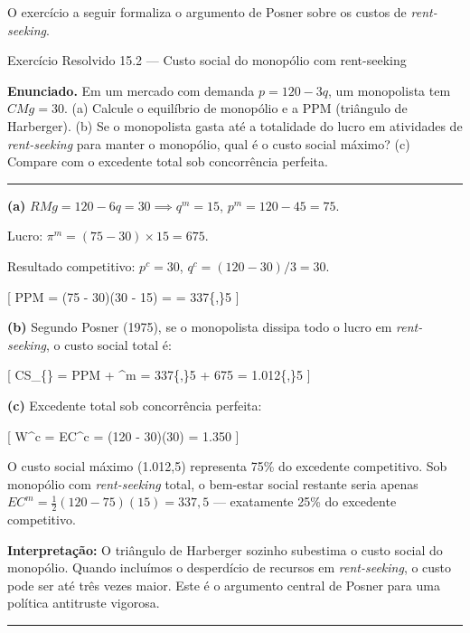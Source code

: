 \documentclass[11pt,twoside,openright]{book}
\begin{document}
O exercício a seguir formaliza o argumento de Posner sobre os custos de
\emph{rent-seeking}.

\begin{exresolvidobox}{Exercício Resolvido 15.2 — Custo social do monopólio com rent-seeking}

\textbf{Enunciado.} Em um mercado com demanda \(p = 120 - 3q\), um
monopolista tem \(CMg = 30\). (a) Calcule o equilíbrio de monopólio e a
PPM (triângulo de Harberger). (b) Se o monopolista gasta até a
totalidade do lucro em atividades de \emph{rent-seeking} para manter o
monopólio, qual é o custo social máximo? (c) Compare com o excedente
total sob concorrência perfeita.

\begin{center}\rule{0.5\linewidth}{0.5pt}\end{center}

\textbf{(a)} \(RMg = 120 - 6q = 30 \implies q^m = 15\),
\(p^m = 120 - 45 = 75\).

Lucro: \(\pi^m = (75 - 30) \times 15 = 675\).

Resultado competitivo: \(p^c = 30\), \(q^c = (120-30)/3 = 30\).

{[} PPM = (75 - 30)(30 - 15) =  
 = 337\{,\}5 {]}

\textbf{(b)} Segundo Posner (1975), se o monopolista dissipa todo o
lucro em \emph{rent-seeking}, o custo social total é:

{[} CS\_\{\} = PPM + \pi\^{}m = 337\{,\}5 + 675 =
1.012\{,\}5 {]}

\textbf{(c)} Excedente total sob concorrência perfeita:

{[} W\^{}c = EC\^{}c = (120 - 30)(30) = 1.350 {]}

O custo social máximo (1.012,5) representa 75\% do excedente
competitivo. Sob monopólio com \emph{rent-seeking} total, o bem-estar
social restante seria apenas
\(EC^m = \frac{1}{2}(120-75)(15) = 337{,}5\) --- exatamente 25\% do
excedente competitivo.

\textbf{Interpretação:} O triângulo de Harberger sozinho subestima o
custo social do monopólio. Quando incluímos o desperdício de recursos em
\emph{rent-seeking}, o custo pode ser até três vezes maior. Este é o
argumento central de Posner para uma política antitruste vigorosa.

\end{exresolvidobox}

\begin{center}\rule{0.5\linewidth}{0.5pt}\end{center}
\end{document}
